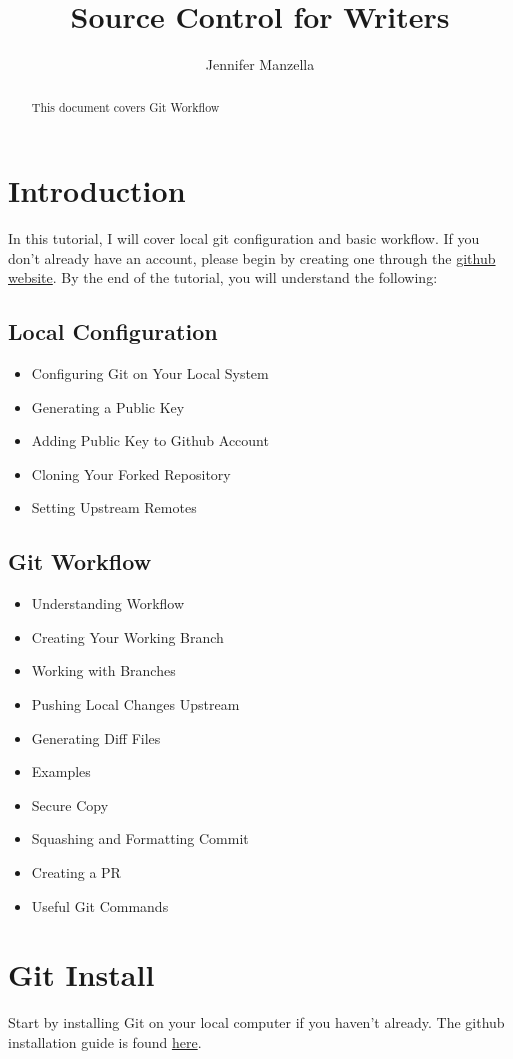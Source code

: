 \documentclass{article}
\title{Source Control for Writers}
\author{Jennifer Manzella}
\begin{document}
\maketitle

\begin{abstract}
This document covers Git Workflow
\end{abstract}

\section{Introduction}
    In this tutorial, I will cover local git configuration and basic workflow. If you don't already have an account, please begin by creating one through the  \href{https://www.github.com}{github website}. By the end of the tutorial, you will understand the following:
    \subsection{Local Configuration}
    \begin{itemize}
        \item Configuring Git on Your Local System
        \item Generating a Public Key
        \item Adding Public Key to Github Account
        \item Cloning Your Forked Repository
        \item Setting Upstream Remotes
        \end{itemize}
    \subsection{Git Workflow}
    \begin{itemize}
        \item Understanding Workflow
        \item Creating Your Working Branch
        \item Working with Branches
        \item Pushing Local Changes Upstream
        \item Generating Diff Files
        \item Examples
        \item Secure Copy
        \item Squashing and Formatting Commit
        \item Creating a PR
        \item Useful Git Commands
    \end{itemize}

\section{Git Install}
Start by installing Git on your local computer if you haven't already. The github installation guide is found 
 \href{https://github.com/git-guides/install-git}{here}.
\end{document}
